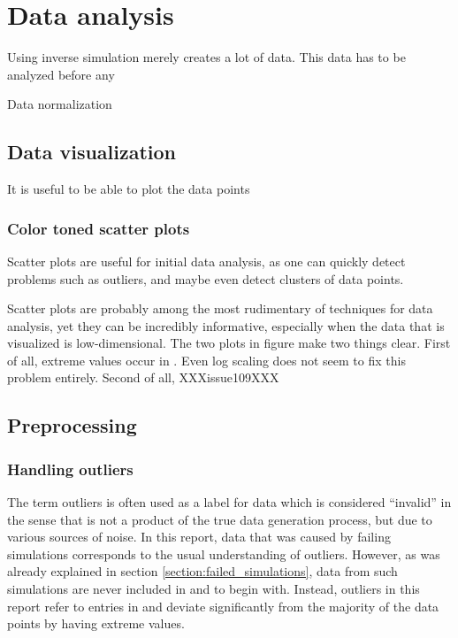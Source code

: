 \section{Data analysis}\label{section:data_analysis_techniques}
Using inverse simulation merely creates a lot of data. This data has to be analyzed before any 

Data normalization

\subsection{Data visualization}
It is useful to be able to plot the data points 

\subsubsection{Color toned scatter plots}
Scatter plots are useful for initial data analysis, as one can quickly detect problems such as outliers, and maybe even detect clusters of data points. 

Scatter plots are probably among the most rudimentary of techniques for data analysis, yet they can be incredibly informative, especially when the data that is visualized is low-dimensional.
The two plots in figure make two things clear. First of all, extreme values occur in \stdev. Even log scaling does not seem to fix this problem entirely. Second of all, XXXissue109XXX


\subsection{Preprocessing}



\subsubsection{Handling outliers}
The term outliers is often used as a label for data which is considered ``invalid'' in the sense that is not a product of the true data generation process, but  due to various sources of noise. In this report, data that was caused by failing simulations corresponds to the usual understanding of outliers. However, as was already explained in section \ref{section:failed_simulations}, data from such simulations are never included in \datamatrixpar{} and \datamatrixfit{} to begin with. Instead, outliers in this report refer to entries in \datamatrixpar{} and \datamatrixfit{}  deviate significantly from the majority of the data points by having extreme values.

